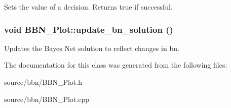 \label{classBBN__Plot_a9b06ca52231b165a1fddad2b92cef7e2}
Sets the value of a decision. Returns true if successful. \hypertarget{classBBN__Plot_a452d2d4a9b15217481ef83b781903627}{
\subsubsection[{update\_\-bn\_\-solution}]{\setlength{\rightskip}{0pt plus 5cm}void BBN\_\-Plot::update\_\-bn\_\-solution ()}}
\label{classBBN__Plot_a452d2d4a9b15217481ef83b781903627}
Updates the Bayes Net solution to reflect changes in bn. 

The documentation for this class was generated from the following files:\begin{DoxyCompactItemize}
\item 
source/bbn/BBN\_\-Plot.h\item 
source/bbn/BBN\_\-Plot.cpp\end{DoxyCompactItemize}
